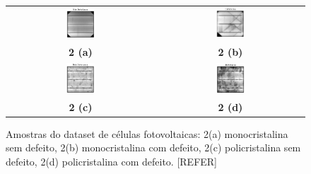 \documentclass[conference]{IEEEtran}
\begin{document}
\begin{figure}[htbp]
    \centering
    \begin{tabular}{cc}
        \includegraphics[width=0.20\textwidth]{images/mono-no-defect.png} &
        \includegraphics[width=0.20\textwidth]{images/mono-defect.png}
        \\
        \textbf{2 (a)}                                                    &
        \textbf{2 (b)}                                                      \\
        \includegraphics[width=0.20\textwidth]{images/poly-no-defect.png} &
        \includegraphics[width=0.20\textwidth]{images/poly-defect.png}
        \\
        \textbf{2 (c)}                                                    &
        \textbf{2 (d)}                                                      \\
    \end{tabular}
    \caption{Amostras do dataset de células fotovoltaicas: 2(a) monocristalina
        sem defeito, 2(b) monocristalina com defeito, 2(c) policristalina sem
        defeito,
        2(d) policristalina com defeito. [REFER]}
    \label{fig:amostras-dataset}
\end{figure}
\end{document}
